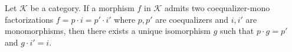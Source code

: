 Let $\mathcal{K}$ be a category. If a morphism $f$ in $\mathcal{K}$ admits two coequalizer-mono factorizations $f = p \cdot i = p' \cdot i'$ where $p, p'$ are coequalizers and $i, i'$ are monomorphisms, then there exists a unique isomorphism $g$ such that $p \cdot g = p'$ and $g \cdot i' = i$.

